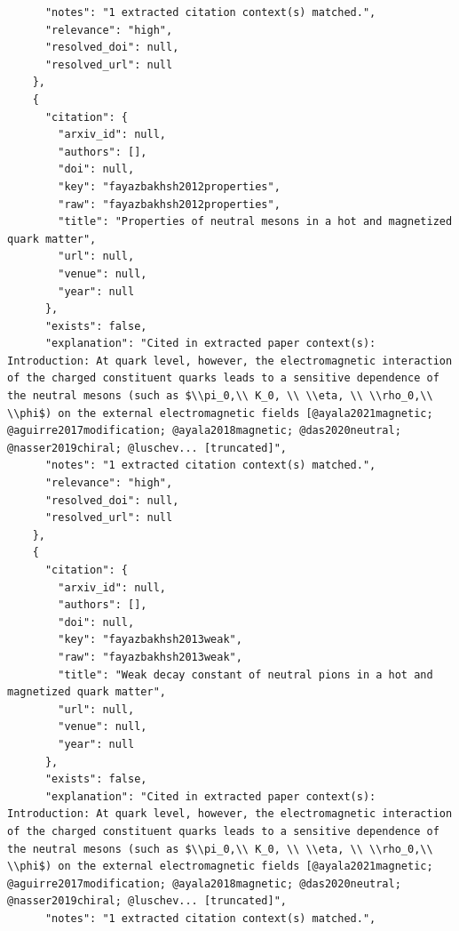 \documentclass[11pt]{article}
\begin{document}
\begin{verbatim}
      "notes": "1 extracted citation context(s) matched.",
      "relevance": "high",
      "resolved_doi": null,
      "resolved_url": null
    },
    {
      "citation": {
        "arxiv_id": null,
        "authors": [],
        "doi": null,
        "key": "fayazbakhsh2012properties",
        "raw": "fayazbakhsh2012properties",
        "title": "Properties of neutral mesons in a hot and magnetized quark matter",
        "url": null,
        "venue": null,
        "year": null
      },
      "exists": false,
      "explanation": "Cited in extracted paper context(s): Introduction: At quark level, however, the electromagnetic interaction of the charged constituent quarks leads to a sensitive dependence of the neutral mesons (such as $\\pi_0,\\ K_0, \\ \\eta, \\ \\rho_0,\\ \\phi$) on the external electromagnetic fields [@ayala2021magnetic; @aguirre2017modification; @ayala2018magnetic; @das2020neutral; @nasser2019chiral; @luschev... [truncated]",
      "notes": "1 extracted citation context(s) matched.",
      "relevance": "high",
      "resolved_doi": null,
      "resolved_url": null
    },
    {
      "citation": {
        "arxiv_id": null,
        "authors": [],
        "doi": null,
        "key": "fayazbakhsh2013weak",
        "raw": "fayazbakhsh2013weak",
        "title": "Weak decay constant of neutral pions in a hot and magnetized quark matter",
        "url": null,
        "venue": null,
        "year": null
      },
      "exists": false,
      "explanation": "Cited in extracted paper context(s): Introduction: At quark level, however, the electromagnetic interaction of the charged constituent quarks leads to a sensitive dependence of the neutral mesons (such as $\\pi_0,\\ K_0, \\ \\eta, \\ \\rho_0,\\ \\phi$) on the external electromagnetic fields [@ayala2021magnetic; @aguirre2017modification; @ayala2018magnetic; @das2020neutral; @nasser2019chiral; @luschev... [truncated]",
      "notes": "1 extracted citation context(s) matched.",

\end{verbatim}
\end{document}
